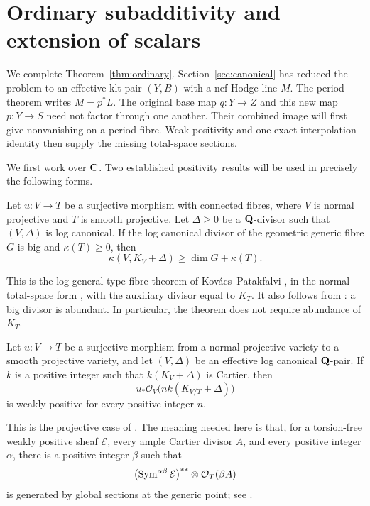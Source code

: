 \section{Ordinary subadditivity and extension of scalars}\label{sec:ordinary}\label{altord:sec:application}

We complete Theorem~\ref{thm:ordinary}. Section~\ref{sec:canonical}
has reduced the problem to an effective klt pair $(Y,B)$ with a nef
Hodge line $M$. The period theorem writes $M=p^*L$. The original
base map $q:Y\to Z$ and this new map $p:Y\to S$ need not factor
through one another. Their combined image will first give
nonvanishing on a period fibre. Weak positivity and one exact
interpolation identity then supply the missing total-space sections.

We first work over \(\mathbf C\).  Two established positivity results will be
used in precisely the following forms.

\begin{theorem}
\label{altord:a:log-general-type}
Let \(u:V\to T\) be a surjective morphism with connected fibres, where
\(V\) is normal projective and \(T\) is smooth projective.  Let
\(\Delta\geq0\) be a \(\mathbf Q\)-divisor such that \((V,\Delta)\) is log
canonical.  If the log canonical divisor of the geometric generic
fibre \(G\) is big and \(\kappa(T)\geq0\), then
\[
 \kappa(V,K_V+\Delta)\geq \dim G+\kappa(T).
\]
\end{theorem}

This is the log-general-type-fibre theorem of Kov\'acs--Patakfalvi
\cite[Theorem~9.9]{KovacsPatakfalvi}, in the normal-total-space form
\cite[Theorem~2.11]{Hashizume}, with the auxiliary
divisor equal to \(K_T\).  It also follows from
\cite[Theorem~1.4(1)]{Hashizume}: a big divisor is abundant.  In
particular, the theorem does not require abundance of \(K_T\).

\begin{theorem}\label{altord:a:weak-positivity}
Let \(u:V\to T\) be a surjective morphism from a normal projective
variety to a smooth projective variety, and let
\((V,\Delta)\) be an effective log canonical \(\mathbf Q\)-pair.  If
\(k\) is a positive integer such that \(k(K_V+\Delta)\) is Cartier,
then
\[
 u_*\mathcal O_V\bigl(nk(K_{V/T}+\Delta)\bigr)
\]
is weakly positive for every positive integer \(n\).
\end{theorem}

This is the projective case of \cite[Theorem~1.1]{FujinoWeakPositivity}.
The meaning needed here is that, for a torsion-free weakly positive
sheaf \(\mathcal E\), every ample Cartier divisor \(A\), and every
positive integer \(\alpha\), there is a positive integer \(\beta\)
such that
\[
 \bigl(\operatorname{Sym}^{\alpha\beta}\mathcal E\bigr)^{**}
       \otimes\mathcal O_T(\beta A)
\]
is generated by global sections at the generic point; see
\cite[Definitions~7.1--7.2]{FujinoWeakPositivity}.

